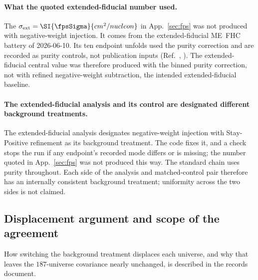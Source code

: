 \paragraph{What the quoted extended-fiducial number used.} The $\sigma_{\mathrm{ext}}=\SI{\fpsSigma}{cm^2/nucleon}$ in App.~\ref{sec:fps} was not produced with negative-weight injection. It comes from the extended-fiducial ME~FHC battery of 2026-06-10. Its ten endpoint unfolds used the purity correction and are recorded as purity controls, not publication inputs (Ref.~\cite{NoteRecords2026}, ). The extended-fiducial central value was therefore produced with the binned purity correction, not with refined negative-weight subtraction, the intended extended-fiducial baseline.

\paragraph{The extended-fiducial analysis and its control are designated different background treatments.} The extended-fiducial analysis designates negative-weight injection with Stay-Positive refinement as its background treatment. The code fixes it, and a check stops the run if any endpoint's recorded mode differs or is missing; the number quoted in App.~\ref{sec:fps} was not produced this way. The standard chain uses purity throughout. Each side of the analysis and matched-control pair therefore has an internally consistent background treatment; uniformity across the two sides is not claimed.

\subsection{Displacement argument and scope of the agreement}

How switching the background treatment displaces each universe, and why that leaves the $187$-universe covariance nearly unchanged, is described in the records document.

